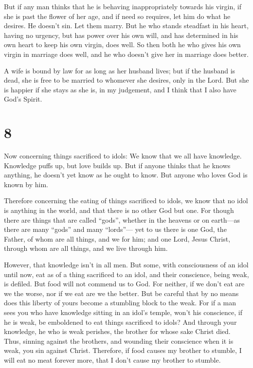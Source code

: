 But if any man thinks that he is behaving inappropriately
towards his virgin, if she is past the flower of her age, and if need so
requires, let him do what he desires. He doesn't sin. Let them marry.
 But he who stands steadfast in his heart, having no
urgency, but has power over his own will, and has determined in his own
heart to keep his own virgin, does well.  So then both he
who gives his own virgin in marriage does well, and he who doesn't give
her in marriage does better.

 A wife is bound by law for as long as her husband lives;
but if the husband is dead, she is free to be married to whomever she
desires, only in the Lord.  But she is happier if she stays
as she is, in my judgement, and I think that I also have God's Spirit.

\hypertarget{section-7}{%
\section{8}\label{section-7}}

 Now concerning things sacrificed to idols: We know that we
all have knowledge. Knowledge puffs up, but love builds up. 
But if anyone thinks that he knows anything, he doesn't yet know as he
ought to know.  But anyone who loves God is known by him.

 Therefore concerning the eating of things sacrificed to
idols, we know that no idol is anything in the world, and that there is
no other God but one.  For though there are things that are
called ``gods'', whether in the heavens or on earth---as there are many
``gods'' and many ``lords''---  yet to us there is one God,
the Father, of whom are all things, and we for him; and one Lord, Jesus
Christ, through whom are all things, and we live through him.

 However, that knowledge isn't in all men. But some, with
consciousness of an idol until now, eat as of a thing sacrificed to an
idol, and their conscience, being weak, is defiled.  But
food will not commend us to God. For neither, if we don't eat are we the
worse, nor if we eat are we the better.  But be careful that
by no means does this liberty of yours become a stumbling block to the
weak.  For if a man sees you who have knowledge sitting in
an idol's temple, won't his conscience, if he is weak, be emboldened to
eat things sacrificed to idols?  And through your
knowledge, he who is weak perishes, the brother for whose sake Christ
died.  Thus, sinning against the brothers, and wounding
their conscience when it is weak, you sin against Christ. 
Therefore, if food causes my brother to stumble, I will eat no meat
forever more, that I don't cause my brother to stumble.

